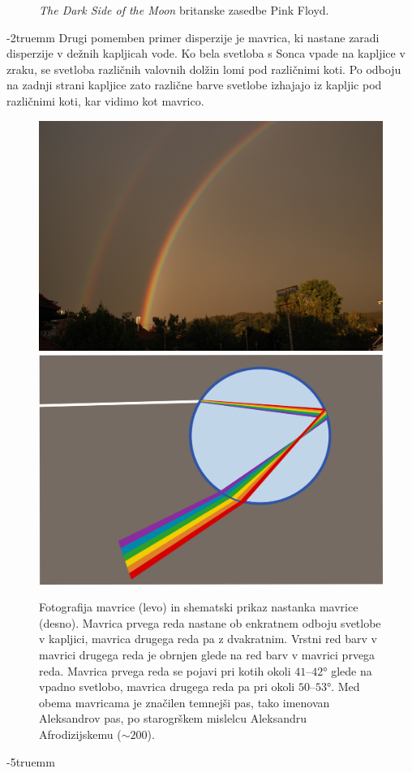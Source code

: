 \begin{example}
\begin{figure}[ht]
{{\it The Dark Side of the Moon} britanske zasedbe Pink Floyd.}
\label{fig:09_prizma}
\end{figure}
\vglue-2truemm
Drugi pomemben primer disperzije je mavrica, ki nastane zaradi
disperzije v dežnih kapljicah vode. Ko bela svetloba s Sonca vpade
na kapljice v zraku, se svetloba različnih valovnih dolžin 
lomi pod različnimi koti. Po odboju na zadnji strani kapljice 
zato različne barve svetlobe izhajajo iz kapljic pod različnimi koti, 
kar vidimo kot mavrico.
\begin{figure}[ht]
\centering
\includegraphics[width=7truecm]{slike/09_mavrica_photo.jpg}\hfill
\includegraphics[width=7truecm]{slike/09_mavrica_disp.png}
\caption{Fotografija mavrice (levo) in shematski prikaz nastanka
mavrice (desno). Mavrica prvega reda nastane ob enkratnem
odboju svetlobe v kapljici, mavrica drugega reda pa z dvakratnim.
Vrstni red barv v mavrici drugega reda je obrnjen glede na 
red barv v mavrici prvega reda. Mavrica prvega reda se pojavi pri 
kotih okoli $41$--$42\si{\degree}$ glede na vpadno svetlobo, mavrica drugega
reda pa pri okoli $50$--$53\si{\degree}$. Med obema mavricama je značilen 
temnejši pas, tako imenovan Aleksandrov pas, po starogrškem mislelcu Aleksandru
Afrodizijskemu ($\sim 200$).}
\label{fig:09_mavrica}
\end{figure}
\vglue-5truemm
\end{example}

